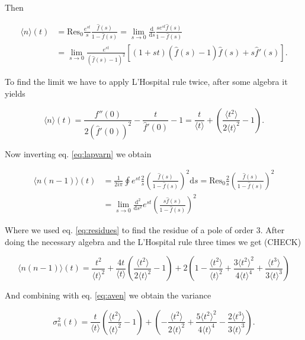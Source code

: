 Then

\begin{equation}
  \begin{split}
    \langle n\rangle(t)&=\text{Res}_0\frac{e^{st}}{s}\frac{\hat{f}(s)}{1-\hat{f}(s)}=\lim_{s\to0}\frac{\mathrm{d}}{\mathrm{d}s}\frac{se^{st}\hat{f}(s)}{1-\hat{f}(s)}\\
    & = \lim_{s\to0}\frac{e^{st}}{(\hat{f}(s)-1)^2}\left[(1+st)(\hat{f}(s)-1)\hat{f}(s) + s\hat{f}'(s)\right].
  \end{split}
\end{equation}

To find the limit we have to apply L'Hospital rule twice, after some algebra it yields

\begin{equation}
  \label{eq:aven}
  \langle n\rangle(t)=\frac{\hat{f}''(0)}{2(\hat{f}'(0))^2}-\frac{t}{\hat{f}'(0)}-1=\frac{t}{\langle t\rangle}+\left(\frac{\langle t^2\rangle}{2\langle t\rangle^2}-1\right).
\end{equation}

Now inverting eq. \ref{eq:lapvarn} we obtain

\begin{equation}
  \begin{split}
    \langle n(n-1)\rangle(t)&=\frac{1}{2i\pi}\oint e^{st}\frac{2}{s}\left(\frac{\hat{f}(s)}{1-\hat{f}(s)}\right)^2\mathrm{d}s=\text{Res}_0\frac{2}{s}\left(\frac{\hat{f}(s)}{1-\hat{f}(s)}\right)^2\\
&=\lim_{s\to0}\frac{\mathrm{d}^2}{\mathrm{d}s^2}e^{st}\left(\frac{s\hat{f}(s)}{1-\hat{f}(s)}\right)^2
  \end{split}
\end{equation}

Where we used eq. \ref{eq:residues} to find the residue of a pole of order $3$. After doing the necessary algebra and the L'Hospital rule three times we get (CHECK)

\begin{equation}
  \langle n(n-1)\rangle(t)=\frac{t^2}{\langle t\rangle^2}+\frac{4t}{\langle t\rangle}\left(\frac{\langle t^2\rangle}{2\langle t\rangle^2}-1\right)+2\left(1-\frac{\langle t^2\rangle}{\langle t\rangle^2}+\frac{3\langle t^2\rangle^2}{4\langle t\rangle^4}+\frac{\langle t^3\rangle}{3\langle t\rangle^3}\right)
\end{equation}

And combining with eq. \ref{eq:aven} we obtain the variance

\begin{equation}
  \label{eq:stdn}
  \sigma_n^2(t) = \frac{t}{\langle t\rangle}\left(\frac{\langle t^2\rangle}{\langle t\rangle^2}-1\right)+\left(-\frac{\langle t^2\rangle}{2\langle t\rangle^2} + \frac{5\langle t^2\rangle^2}{4\langle t\rangle^4}-\frac{2\langle t^3\rangle}{3\langle t\rangle^3}\right).
\end{equation}

